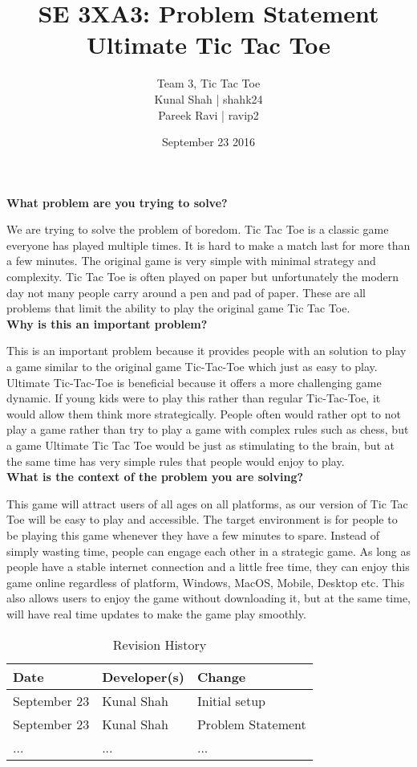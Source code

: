 \documentclass{article}
\title{SE 3XA3: Problem Statement\\Ultimate Tic Tac Toe }
\author{Team 3, Tic Tac Toe
		\\ Kunal Shah | shahk24
		\\ Pareek Ravi | ravip2
}
\date{September 23 2016}
\begin{document}
\maketitle

\noindent \textbf{What problem are you trying to solve?}

We are trying to solve the problem of boredom. Tic Tac Toe is a classic game 
everyone has played multiple times. It is hard to make a match last for more 
than a few minutes. The original game is very simple with minimal strategy and 
complexity. Tic Tac Toe is often played on paper but unfortunately the modern 
day not many people carry around a pen and pad of paper. These are all 
problems that limit the ability to play the original game Tic Tac Toe.\\

\noindent \textbf {Why is this an important problem?}

This is an important problem because it provides people with an solution to 
play a game similar to the original game Tic-Tac-Toe which just as easy to 
play. Ultimate Tic-Tac-Toe is beneficial because it offers a more challenging 
game dynamic. If young kids were to play this rather than regular Tic-Tac-Toe, 
it would allow them think more strategically. People often would rather opt to 
not play a game rather than try to play a game with complex rules such as 
chess, but a game Ultimate Tic Tac Toe would be just as stimulating to the 
brain, but at the same time has very simple rules that people would enjoy to 
play.\\

\noindent \textbf {What is the context of the problem you are solving?}

This game will attract users of all ages on all platforms, as our version of 
Tic Tac Toe will be easy to play and accessible. The target environment is for 
people to be playing this game whenever they have a few minutes to spare. 
Instead of simply wasting time, people can engage each other in a strategic 
game. As long as people have a stable internet connection and a little free 
time, they can enjoy this game online regardless of platform, Windows, MacOS, 
Mobile, Desktop etc. This also allows users to enjoy the game without 
downloading it, but at the same time, will have real time updates to make the 
game play smoothly.\\

\newpage

\begin{table}[hp]
\caption{Revision History} \label{TblRevisionHistory}
\begin{tabularx}{\textwidth}{llX}
\toprule
\textbf{Date} & \textbf{Developer(s)} & \textbf{Change}\\
\midrule
September 23 & Kunal Shah & Initial setup\\
September 23 & Kunal Shah & Problem Statement \\
... & ... & ...\\
\bottomrule
\end{tabularx}
\end{table}
\end{document}
